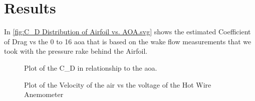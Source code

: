 \chapter{Results}
\label{cp:results}


 In \autoref{fig:C_D Distribution of Airfoil vs. AOA.svg} shows the estimated Coefficient of Drag vs the 0 to 16 {\degree} \acrshort{aoa} that is based on the wake flow measurements that we took with the pressure rake behind the Airfoil. 

\begin{figure}[htpb]
    \centering
    
    \caption[Plot of the \gls{C_D} in relationship to the \acrshort{aoa}.]{Plot of the \gls{C_D} in relationship to the \acrshort{aoa}.}
    \label{fig:C_D Distribution of Airfoil vs. AOA.svg}
\end{figure}

\begin{figure}[htpb]
    \centering
    
    \caption[Plot of the Velocity of the air vs the voltage of the  Hot Wire Anemometer]{Plot of the Velocity of the air vs the voltage of the  Hot Wire Anemometer}
    \label{fig: Velocity vs. Voltage.svg}
\end{figure}
